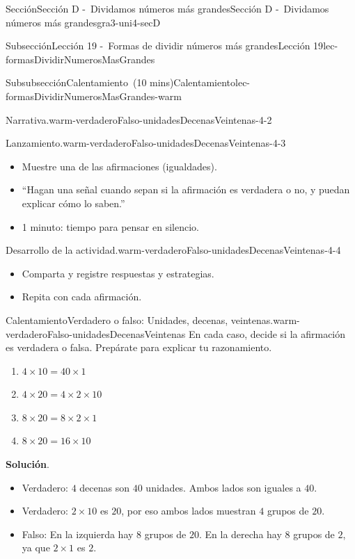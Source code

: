 \documentclass[oneside,10pt,]{article}
\newcommand{\blocktitlefont}{\relax}
\begin{document}
\begin{sectionptx}{Sección}{Sección D -~Dividamos números más grandes}{}{Sección D -~Dividamos números más grandes}{}{}{gra3-uni4-secD}
\begin{subsectionptx}{Subsección}{Lección 19 -~Formas de dividir números más grandes}{}{Lección 19}{}{}{lec-formasDividirNumerosMasGrandes}
\begin{subsubsectionptx}{Subsubsección}{Calentamiento~(10 mins)}{}{Calentamiento}{}{}{lec-formasDividirNumerosMasGrandes-warm}
\begin{paragraphs}{Narrativa.}{warm-verdaderoFalso-unidadesDecenasVeintenas-4-2}
\end{paragraphs}%
\begin{paragraphs}{Lanzamiento.}{warm-verdaderoFalso-unidadesDecenasVeintenas-4-3}%
%
\begin{itemize}[label=\textbullet]
\item{}Muestre una de las afirmaciones (igualdades).%
\item{}``Hagan una señal cuando sepan si la afirmación es verdadera o no, y puedan explicar cómo lo saben.''%
\item{}1 minuto: tiempo para pensar en silencio.%
\end{itemize}
\end{paragraphs}%
\begin{paragraphs}{Desarrollo de la actividad.}{warm-verdaderoFalso-unidadesDecenasVeintenas-4-4}%
%
\begin{itemize}[label=\textbullet]
\item{}Comparta y registre respuestas y estrategias.%
\item{}Repita con cada afirmación.%
\end{itemize}
\end{paragraphs}%
\begin{exploration}{Calentamiento}{Verdadero o falso: Unidades, decenas, veintenas.}{warm-verdaderoFalso-unidadesDecenasVeintenas}%
En cada caso, decide si la afirmación es verdadera o falsa. Prepárate para explicar tu razonamiento.%
%
\begin{enumerate}[label={\Alph*.}]
\item{}\(\displaystyle 4 \times 10 = 40 \times 1\)%
\item{}\(\displaystyle 4 \times 20 = 4 \times 2 \times 10\)%
\item{}\(\displaystyle 8 \times 20 = 8 \times 2 \times 1\)%
\item{}\(\displaystyle 8 \times 20 = 16 \times 10\)%
\end{enumerate}
\par\smallskip%
\noindent\textbf{\blocktitlefont Solución}.\hypertarget{warm-verdaderoFalso-unidadesDecenasVeintenas-3}{}\quad{}%
\begin{itemize}[label=\textbullet]
\item{}Verdadero: \(4\) decenas son \(40\) unidades. Ambos lados son iguales a \(40\).%
\item{}Verdadero: \(2 \times 10\) es \(20\), por eso ambos lados muestran \(4\) grupos de \(20\).%
\item{}Falso: En la izquierda hay \(8\) grupos de \(20\). En la derecha hay \(8\) grupos de \(2\), ya que \(2 \times 1\) es \(2\).%

\end{itemize}
\end{exploration}
\end{subsubsectionptx}
\end{subsectionptx}
\end{sectionptx}
\end{document}
